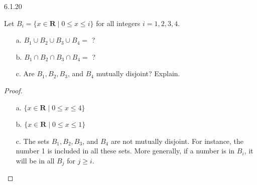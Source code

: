 \begin{question}
    {6.1.20}
    {
        Let $B_i=\{x \in \mathbf{R} \mid 0 \leq x \leq i\}$ for all integers $i=1,2,3,4$.
        \vspace{-\baselineskip}
        \begin{enumerate}
            \item[a.] $B_1 \cup B_2 \cup B_3 \cup B_4=$ ?
            \item[b.] $B_1 \cap B_2 \cap B_3 \cap B_4=$ ?
            \item[c.] Are $B_1, B_2, B_3$, and $B_4$ mutually disjoint? Explain.
        \end{enumerate}
    }
\end{question}
\begin{proof}
    \begin{enumerate}
        \item[a.] $\{x \in \mathbf{R} \mid 0 \leq x \leq 4\}$
        \item[b.] $\{x \in \mathbf{R} \mid 0 \leq x \leq 1\}$
        \item[c.] The sets $B_1, B_2, B_3$, and $B_4$ are not mutually disjoint. For instance, the number 1 is included in all these sets. More generally, if a number is in $B_i$, it will be in all $B_j$ for $j \geq i$.
    \end{enumerate}
    \vspace{-\baselineskip}
\end{proof}

